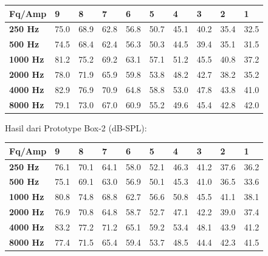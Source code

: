 \documentclass[12pt,]{article}
\begin{document}
	\begin{center}
		\begin{tabular}{|l|l|l|l|l|l|l|l|l|l|}
			\hline
			\textbf{Fq/Amp}  & \textbf{9} & \textbf{8} & \textbf{7} & \textbf{6} & \textbf{5} & \textbf{4} & \textbf{3} & \textbf{2} & \textbf{1} \\ \hline
			\textbf{250 Hz}  & 75.0       & 68.9       & 62.8       & 56.8       & 50.7       & 45.1       & 40.2       & 35.4       & 32.5       \\ \hline
			\textbf{500 Hz}  & 74.5       & 68.4       & 62.4       & 56.3       & 50.3       & 44.5       & 39.4       & 35.1       & 31.5       \\ \hline
			\textbf{1000 Hz} & 81.2       & 75.2       & 69.2       & 63.1       & 57.1       & 51.2       & 45.5       & 40.8       & 37.2       \\ \hline
			\textbf{2000 Hz} & 78.0       & 71.9       & 65.9       & 59.8       & 53.8       & 48.2       & 42.7       & 38.2       & 35.2       \\ \hline
			\textbf{4000 Hz} & 82.9       & 76.9       & 70.9       & 64.8       & 58.8       & 53.0       & 47.8       & 43.8       & 41.0       \\ \hline
			\textbf{8000 Hz} & 79.1       & 73.0       & 67.0       & 60.9       & 55.2       & 49.6       & 45.4       & 42.8       & 42.0       \\ \hline
		\end{tabular}
	\end{center}

	Hasil dari Prototype Box-2 (dB-SPL):
	
	\begin{center}
		\begin{tabular}{|l|l|l|l|l|l|l|l|l|l|}
			\hline
			\textbf{Fq/Amp}  & \textbf{9} & \textbf{8} & \textbf{7} & \textbf{6} & \textbf{5} & \textbf{4} & \textbf{3} & \textbf{2} & \textbf{1} \\ \hline
			\textbf{250 Hz}  & 76.1       & 70.1       & 64.1       & 58.0       & 52.1       & 46.3       & 41.2       & 37.6       & 36.2       \\ \hline
			\textbf{500 Hz}  & 75.1       & 69.1       & 63.0       & 56.9       & 50.1       & 45.3       & 41.0       & 36.5       & 33.6       \\ \hline
			\textbf{1000 Hz} & 80.8       & 74.8       & 68.8       & 62.7       & 56.6       & 50.8       & 45.5       & 41.1       & 38.1       \\ \hline
			\textbf{2000 Hz} & 76.9       & 70.8       & 64.8       & 58.7       & 52.7       & 47.1       & 42.2       & 39.0       & 37.4       \\ \hline
			\textbf{4000 Hz} & 83.2       & 77.2       & 71.2       & 65.1       & 59.2       & 53.4       & 48.1       & 43.9       & 41.2       \\ \hline
			\textbf{8000 Hz} & 77.4       & 71.5       & 65.4       & 59.4       & 53.7       & 48.5       & 44.4       & 42.3       & 41.5       \\ \hline
		\end{tabular}
	\end{center}
\end{document}
